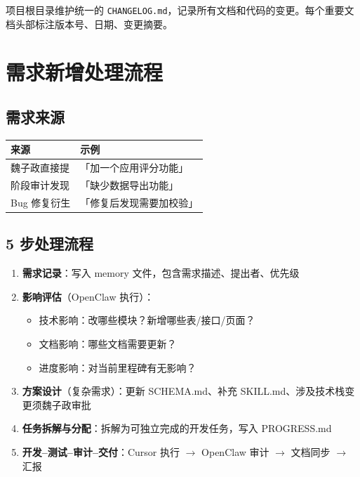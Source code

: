 \documentclass[11pt,a4paper]{article}
\begin{document}
项目根目录维护统一的 \texttt{CHANGELOG.md}，记录所有文档和代码的变更。每个重要文档头部标注版本号、日期、变更摘要。

\section{需求新增处理流程}

\subsection{需求来源}

\begin{table}[h]
\centering
\begin{tabular}{ll}
\toprule
\textbf{来源} & \textbf{示例} \\
\midrule
魏子政直接提 & 「加一个应用评分功能」 \\
阶段审计发现 & 「缺少数据导出功能」 \\
Bug 修复衍生 & 「修复后发现需要加校验」 \\
\bottomrule
\end{tabular}
\end{table}

\subsection{5 步处理流程}

\begin{enumerate}
  \item \textbf{需求记录}：写入 memory 文件，包含需求描述、提出者、优先级
  \item \textbf{影响评估}（OpenClaw 执行）：
    \begin{itemize}[nosep]
      \item 技术影响：改哪些模块？新增哪些表/接口/页面？
      \item 文档影响：哪些文档需要更新？
      \item 进度影响：对当前里程碑有无影响？
    \end{itemize}
  \item \textbf{方案设计}（复杂需求）：更新 SCHEMA.md、补充 SKILL.md、涉及技术栈变更须魏子政审批
  \item \textbf{任务拆解与分配}：拆解为可独立完成的开发任务，写入 PROGRESS.md
  \item \textbf{开发--测试--审计--交付}：Cursor 执行 $\to$ OpenClaw 审计 $\to$ 文档同步 $\to$ 汇报
\end{enumerate}
\end{document}

